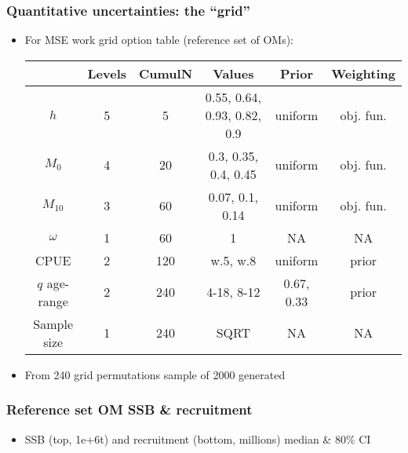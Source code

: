 \documentclass{beamer}
\begin{document}
\begin{frame}
\frametitle{Quantitative uncertainties: the ``grid''}
\begin{itemize}
    \item For MSE work grid option table (reference set of OMs):
\begin{table}
\begin{center}
\label{tab:datasumm}
\begin{tabular}{|cccccc|}
\hline
& {\tiny Levels} & {\tiny CumulN} & {\tiny Values} & {\tiny Prior} & {\tiny Weighting}\\
\hline\hline
{\tiny $h$} & {\tiny 5} & {\tiny 5} & {\tiny 0.55, 0.64, 0.93, 0.82, 0.9} & {\tiny uniform} & {\tiny obj. fun.}\\
{\tiny $M_0$} & {\tiny 4} & {\tiny 20} & {\tiny 0.3, 0.35, 0.4, 0.45} & {\tiny uniform} & {\tiny obj. fun.}\\
{\tiny $M_{10}$} & {\tiny 3} & {\tiny 60} & {\tiny 0.07, 0.1, 0.14} & {\tiny uniform} & {\tiny obj. fun.}\\
{\tiny $\omega$} & {\tiny 1} & {\tiny 60} & {\tiny 1} & {\tiny NA} & {\tiny NA}\\
{\tiny CPUE} & {\tiny 2} & {\tiny 120} & {\tiny w.5, w.8} & {\tiny uniform} & {\tiny prior}\\
{\tiny $q$ age-range} & {\tiny 2} & {\tiny 240} & {\tiny 4-18, 8-12} & {\tiny 0.67, 0.33} & {\tiny prior}\\
{\tiny Sample size} & {\tiny 1} & {\tiny 240} & {\tiny SQRT} & {\tiny NA} & {\tiny NA}\\
\hline
\end{tabular}
\end{center}
\end{table}
\item From 240 grid permutations sample of 2000 generated
\end{itemize}
\end{frame}
\begin{frame}
\frametitle{Reference set OM SSB \& recruitment}
\begin{itemize}
    \item SSB (top, 1e+6t) and recruitment (bottom, millions) median \& 80\% CI
\begin{figure}
\begin{center}
\vspace{-0.75cm}
\end{center}
\end{figure}
\end{itemize}
\end{frame}
\end{document}
